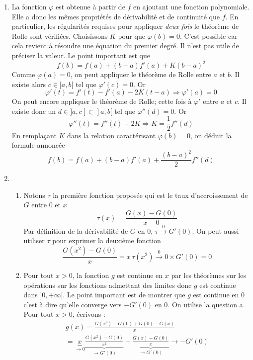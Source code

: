 \begin{enumerate}
 \item La fonction $\varphi$ est obtenue à partir de $f$ en ajoutant une fonction polynomiale. Elle a donc les mêmes propriétés de dérivabilité et de continuité que $f$. En particulier, les régularités requises pour appliquer \emph{deux fois} le théorème de Rolle sont vérifiées.\newline
Choisissons $K$ pour que $\varphi(b)=0$. C'est possible car cela revient à résoudre une équation du premier degré. Il n'est pas utile de préciser la valeur. Le point important est que 
\begin{displaymath}
 f(b)=f(a)+(b-a)f'(a)+K(b-a)^2
\end{displaymath}
Comme $\varphi(a)=0$, on peut appliquer le théorème de Rolle entre $a$ et $b$. Il existe alors $c\in ]a,b[$ tel que $\varphi'(c)=0$. Or
\begin{displaymath}
 \varphi'(t) = f'(t)-f'(a)-2K(t-a) \Rightarrow \varphi'(a) = 0
\end{displaymath}
On peut encore appliquer le théorème de Rolle; cette fois à $\varphi'$ entre $a$ et $c$. Il existe donc un $d\in]a,c[\subset]a,b[$ tel que $\varphi''(d)=0$. Or
\begin{displaymath}
 \varphi''(t)=f''(t)-2K \Rightarrow K=\frac{1}{2}f''(d)
\end{displaymath}
En remplaçant $K$ dans la relation caractérisant $\varphi(b)=0$, on déduit la formule annoncée
\begin{displaymath}
 f(b)=f(a)+(b-a)f'(a)+\frac{(b-a)^2}{2}f''(d)
\end{displaymath}

\item
\begin{enumerate}
  \item Notons $\tau$ la première fonction proposée qui est le taux d'accroissement de $G$ entre $0$ et $x$
\begin{displaymath}
  \tau(x) = \frac{G(x)-G(0)}{x-0}
\end{displaymath}
Par définition de la dérivabilité de $G$ en $0$, $\tau \xrightarrow{0} G'(0)$.\newline
On peut aussi utiliser $\tau$ pour exprimer la deuxième fonction
\begin{displaymath}
  \frac{G(x^2) - G(0)}{x} = x\, \tau(x^2) \xrightarrow{0} 0\times G'(0) = 0
\end{displaymath}

  \item Pour tout $x>0$, la fonction $g$ est continue en $x$ par les théorèmes sur les opérations sur les fonctions admettant des limites donc $g$ est continue dans $]0,+\infty[$. Le point important est de montrer que $g$ est continue en $0$ c'est à dire qu'elle converge vers $-G'(0)$ en $0$. On utilise la question a. Pour tout $x>0$, écrivons :
\begin{multline*}
 g(x)=\frac{G(x^2)-G(0)+G(0)-G(x)}{x}\\=
\underset{\rightarrow 0}{\underbrace{x}}
\underset{\rightarrow G'(0)}{\underbrace{\frac{G(x^2)-G(0)}{x^2}}}
-\underset{\rightarrow G'(0)}{\underbrace{\frac{G(x)-G(0)}{x}}}
\rightarrow  -G'(0)
\end{multline*}
 

\end{enumerate}
\end{enumerate}
